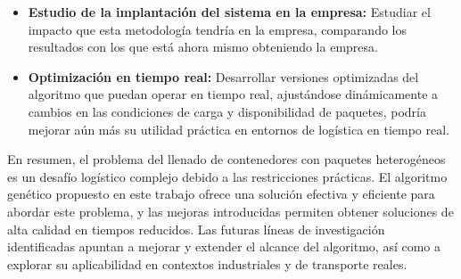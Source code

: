 \documentclass[openany]{article}
\begin{document}
\begin{itemize}
    \item \textbf{Estudio de la implantación del sistema en la empresa:} Estudiar el impacto que esta metodología tendría en la empresa, comparando los resultados con los que está ahora mismo obteniendo la empresa.

    \item \textbf{Optimización en tiempo real:} Desarrollar versiones optimizadas del algoritmo que puedan operar en tiempo real, ajustándose dinámicamente a cambios en las condiciones de carga y disponibilidad de paquetes, podría mejorar aún más su utilidad práctica en entornos de logística en tiempo real.
\end{itemize}

En resumen, el problema del llenado de contenedores con paquetes heterogéneos es un desafío logístico complejo debido a las restricciones prácticas. El algoritmo genético propuesto en este trabajo ofrece una solución efectiva y eficiente para abordar este problema, y las mejoras introducidas permiten obtener soluciones de alta calidad en tiempos reducidos. Las futuras líneas de investigación identificadas apuntan a mejorar y extender el alcance del algoritmo, así como a explorar su aplicabilidad en contextos industriales y de transporte reales.








\newpage


\end{document}
